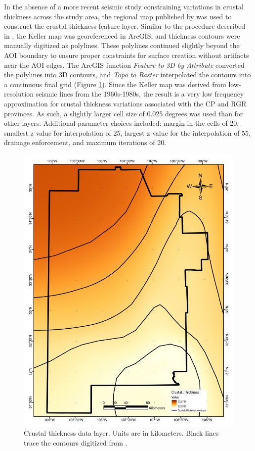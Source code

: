 In the absence of a more recent seismic study constraining variations in crustal thickness across the study area, the regional map published by \citet{keller_comparative_1991} was used to construct the crustal thickness feature layer. Similar to the procedure described in \citep{pepin_new_2018}, the Keller map was georeferenced in ArcGIS, and thickness contours were manually digitized as polylines. These polylines continued slightly beyond the AOI boundary to ensure proper constraints for surface creation without artifacts near the AOI edges. The ArcGIS function \textit{Feature to 3D by Attribute} converted the polylines into 3D contours, and \textit{Topo to Raster} interpolated the contours into a continuous final grid (Figure \ref{fig:feat_crust}). Since the Keller map was derived from low-resolution seismic lines from the 1960s-1980s, the result is a very low frequency approximation for crustal thickness variations associated with the CP and RGR provinces. As such, a slightly larger cell size of 0.025 degrees was used than for other layers. Additional parameter choices included: margin in the cells of 20, smallest z value for interpolation of 25, largest z value for the interpolation of 55, drainage enforcement, and maximum iterations of 20.

\begin{figure}[!htp]
\centering
\includegraphics[scale=.50]{templates/images/Figure-CrustalThickness.pdf}
\caption[Crustal thickness data layer]{Crustal thickness data layer. Units are in kilometers. Black lines trace the contours digitized from \protect\citep{keller_comparative_1991}.}
\label{fig:feat_crust}
\end{figure}

